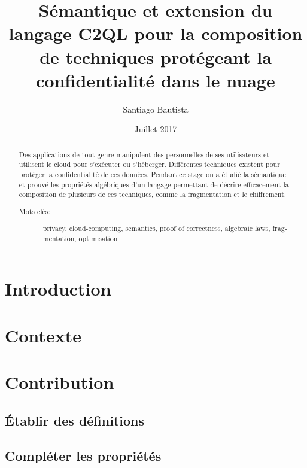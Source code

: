 \documentclass[a4paper,11pt]{article}
\author{Santiago Bautista}
\date{Juillet 2017}
\title{Sémantique et extension du langage C2QL pour la composition de techniques protégeant la confidentialité dans le nuage}
\begin{document}
\maketitle

\begin{abstract}
	Des applications de tout genre manipulent des personnelles de ses utilisateurs
	et utilisent le cloud pour s'exécuter ou s'héberger.
	Différentes techniques existent pour protéger la confidentialité de ces données.
	Pendant ce stage on a étudié la sémantique et prouvé les propriétés algébriques d'un langage permettant de décrire
	efficacement la composition de plusieurs de ces techniques, comme la fragmentation et le chiffrement.
	\begin{description}
		\item[Mots clés:]{\begin{otherlanguage}{english}
				privacy, cloud-computing, semantics, proof of correctness, algebraic laws, fragmentation, optimisation
			\end{otherlanguage}} 
	\end{description} 
	
\end{abstract}

\tableofcontents
\pagebreak

\section{Introduction}


\section{Contexte}
\label{context}


\section{Contribution}


\subsection{Établir des définitions}
\label{defs}


\subsection{Compléter les propriétés}
\label{compl}

\end{document}
